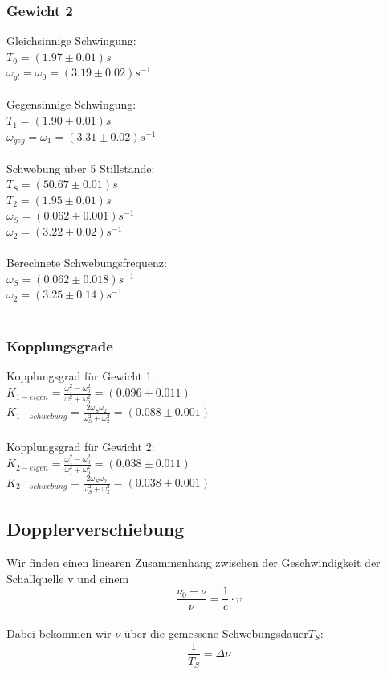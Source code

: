 \documentclass{article}
\begin{document}
\subsubsection{Gewicht 2}
Gleichsinnige Schwingung:\\
$T_0=(1.97 \pm 0.01)\si{s}$\\
$\omega_{gl}=\omega_0=(3.19 \pm 0.02)\si{s^{-1}}$\\
\\
Gegensinnige Schwingung:\\
$T_1=(1.90 \pm 0.01)\si{s}$\\
$\omega_{geg}=\omega_1=(3.31 \pm 0.02)\si{s^{-1}}$\\
\\
Schwebung über 5 Stillstände:\\
$T_S=(50.67 \pm 0.01)\si{s}$\\
$T_2=(1.95 \pm 0.01)\si{s}$\\
$\omega_S=(0.062 \pm 0.001)\si{s^{-1}}$\\
$\omega_2=(3.22 \pm 0.02)\si{s^{-1}}$\\
\\
Berechnete Schwebungsfrequenz:\\
$\omega_S=(0.062 \pm 0.018)\si{s^{-1}}$\\
$\omega_2=(3.25 \pm 0.14)\si{s^{-1}}$\\
\\

\subsubsection{Kopplungsgrade}

Kopplungsgrad für Gewicht 1:\\
$K_{1-eigen}=\frac{\omega_1^2-\omega_0^2}{\omega_1^2+\omega_0^2}=(0.096 \pm 0.011)$\\
$K_{1-schwebung}=\frac{2\omega_S \omega_2}{\omega_S^2 + \omega_2^2}=(0.088 \pm 0.001)$\\
\\
Kopplungsgrad für Gewicht 2:\\
$K_{2-eigen}=\frac{\omega_1^2-\omega_0^2}{\omega_1^2+\omega_0^2}=(0.038 \pm 0.011)$\\
$K_{2-schwebung}=\frac{2\omega_S \omega_2}{\omega_S^2 + \omega_2^2}=(0.038 \pm 0.001)$\\

\subsection{Dopplerverschiebung}
Wir finden einen linearen Zusammenhang zwischen der Geschwindigkeit der Schallquelle v und einem 
\begin{equation}
\label{frequenzlinear}
\frac{\nu_0-\nu}{\nu}=\frac{1}{c}\cdot v
\end{equation}
\\
Dabei bekommen wir $\nu$ über die gemessene Schwebungsdauer$T_S$:
\begin{equation}
\frac{1}{T_S}=\Delta \nu
\end{equation}
\end{document}
